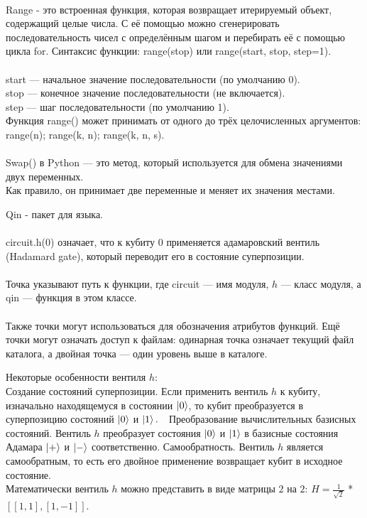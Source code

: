 \documentclass[12pt,a4paper]{article}
\begin{document}
		\hspace{1em}\\
		Range - это встроенная функция, которая возвращает итерируемый объект, содержащий целые числа. С её помощью можно сгенерировать последовательность чисел с определённым шагом и перебирать её с помощью цикла for.
		Синтаксис функции: range(stop) или range(start, stop, step=1).\\

		\hspace{1em}\\
		start — начальное значение последовательности (по умолчанию 0).\\
		stop — конечное значение последовательности (не включается).\\
		step — шаг последовательности (по умолчанию 1).\\

		Функция range() может принимать от одного до трёх целочисленных аргументов:
		range(n); range(k, n); range(k, n, s).\\
	
		\hspace{1em}\\
		Swap() в Python — это метод, который используется для обмена значениями двух переменных.\\
		Как правило, он принимает две переменные и меняет их значения местами.
	
		Qin - пакет для языка.\\
		\hspace{1em}\\
		circuit.h(0) означает, что к кубиту $0$ применяется адамаровский вентиль (Hadamard gate), который переводит его в состояние суперпозиции.\\
	
		\hspace{1em}\\
		Точка указывают путь к функции, где circuit — имя модуля, $h$ — класс модуля, а qin — функция в этом классе.\\
		\hspace{1em}\\
		Также точки могут использоваться для обозначения атрибутов функций.
		Ещё точки могут означать доступ к файлам: одинарная точка означает текущий файл каталога, а двойная точка — один уровень выше в каталоге.
		
		Некоторые особенности вентиля $h$:\\
		Создание состояний суперпозиции. Если применить вентиль $h$ к кубиту, изначально находящемуся в состоянии $\ket{0}$, то кубит преобразуется в суперпозицию состояний $\ket{0}$ и $\ket{1}.
		\hspace{1em}
		$Преобразование вычислительных базисных состояний. Вентиль $h$ преобразует состояния $\ket{0}$ и $\ket{1}$ в базисные состояния Адамара $\ket{+}$ и  $\ket{-}$ соответственно. 
		Самообратность. Вентиль $h$ является самообратным, то есть его двойное применение возвращает кубит в исходное состояние.\\
		Математически вентиль $h$ можно представить в виде матрицы $2$ на $2$: $H = \frac{1}{\sqrt{2}}$ * $[[1, 1], [1, -1]]$.\\
		
\end{document}
